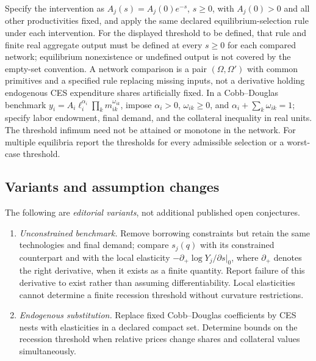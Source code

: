 \documentclass[11pt,a4paper]{article}
\begin{document}
Specify the intervention as \(A_j(s)=A_j(0)e^{-s}\), \(s\ge0\), with \(A_j(0)>0\) and all other productivities fixed, and apply the same declared equilibrium-selection rule under each intervention. For the displayed threshold to be defined, that rule and finite real aggregate output must be defined at every \(s\ge0\) for each compared network; equilibrium nonexistence or undefined output is not covered by the empty-set convention. A network comparison is a pair \((\Omega,\Omega')\) with common primitives and a specified rule replacing missing inputs, not a derivative holding endogenous CES expenditure shares artificially fixed. In a Cobb--Douglas benchmark \(y_i=A_i\ell_i^{\alpha_i}\prod_k m_{ik}^{\omega_{ik}}\), impose \(\alpha_i>0\), \(\omega_{ik}\ge0\), and \(\alpha_i+\sum_k\omega_{ik}=1\); specify labor endowment, final demand, and the collateral inequality in real units. The threshold infimum need not be attained or monotone in the network. For multiple equilibria report the thresholds for every admissible selection or a worst-case threshold.
\subsection*{Variants and assumption changes}
The following are \emph{editorial variants}, not additional published open conjectures.
\begin{enumerate}
\item \emph{Unconstrained benchmark.} Remove borrowing constraints but retain the same technologies and final demand; compare \(s_j(q)\) with its constrained counterpart and with the local elasticity \(-\partial_+\log Y_j/\partial s|_{0}\), where \(\partial_+\) denotes the right derivative, when it exists as a finite quantity. Report failure of this derivative to exist rather than assuming differentiability. Local elasticities cannot determine a finite recession threshold without curvature restrictions.
\item \emph{Endogenous substitution.} Replace fixed Cobb--Douglas coefficients by CES nests with elasticities in a declared compact set. Determine bounds on the recession threshold when relative prices change shares and collateral values simultaneously.
\end{enumerate}
\end{document}
